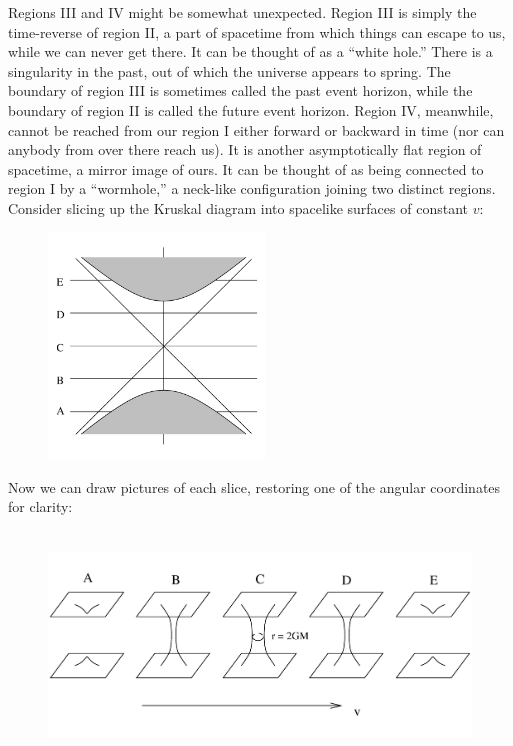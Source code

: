 \documentclass[12pt]{article}
\begin{document}
Regions III and IV might be somewhat unexpected.  Region III is simply
the time-reverse of region II, a part of spacetime from which things
can escape to us, while we can never get there.  It can be thought
of as a ``white hole.''  There is a singularity in the past, out of which 
the universe appears to spring.  The boundary of region III is sometimes
called the past event horizon, while the boundary of region II is called
the future event horizon.  Region IV, meanwhile, cannot be reached
from our region I either forward or backward in time (nor can 
anybody from over there
reach us).  It is another asymptotically flat region of spacetime,
a mirror image of ours.  It can be thought of as being connected to
region I by a ``wormhole,'' a neck-like configuration joining two
distinct regions.  Consider slicing up the Kruskal diagram into spacelike
surfaces of constant $v$:

\begin{figure}[h]
  \centerline{
  \includegraphics[height=6cm]{pdf/seven16}}
\end{figure}

\noindent Now we can draw pictures of each slice, restoring one of 
the angular coordinates for clarity:

\begin{figure}[h]
  \centerline{
  \includegraphics[height=6cm]{pdf/seven17}}
\end{figure}
\end{document}
